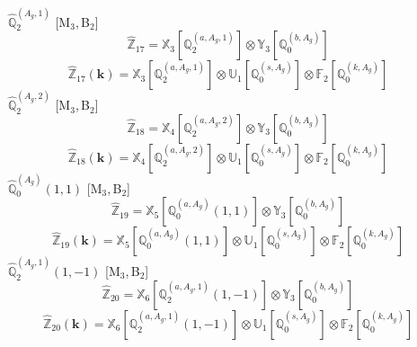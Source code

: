 \documentclass[fleqn,10pt,landscape]{article}
\begin{document}
\begin{itemize}
\noindent {} $\,\,\,\hat{\mathbb{Q}}_{2}^{(A_{g},1)}$ [M$_{3}$,\,B$_{2}$]
\begin{dmath*}
\hat{\mathbb{Z}}_{17}=\mathbb{X}_{3}[\mathbb{Q}_{2}^{(a,A_{g},1)}] \otimes\mathbb{Y}_{3}[\mathbb{Q}_{0}^{(b,A_{g})}]
\end{dmath*}
\begin{dmath*}
\hat{\mathbb{Z}}_{17}(\bm{k})=\mathbb{X}_{3}[\mathbb{Q}_{2}^{(a,A_{g},1)}] \otimes\mathbb{U}_{1}[\mathbb{Q}_{0}^{(s,A_{g})}] \otimes\mathbb{F}_{2}[\mathbb{Q}_{0}^{(k,A_{g})}]
\end{dmath*}
\vspace{4mm}
\noindent {} $\,\,\,\hat{\mathbb{Q}}_{2}^{(A_{g},2)}$ [M$_{3}$,\,B$_{2}$]
\begin{dmath*}
\hat{\mathbb{Z}}_{18}=\mathbb{X}_{4}[\mathbb{Q}_{2}^{(a,A_{g},2)}] \otimes\mathbb{Y}_{3}[\mathbb{Q}_{0}^{(b,A_{g})}]
\end{dmath*}
\begin{dmath*}
\hat{\mathbb{Z}}_{18}(\bm{k})=\mathbb{X}_{4}[\mathbb{Q}_{2}^{(a,A_{g},2)}] \otimes\mathbb{U}_{1}[\mathbb{Q}_{0}^{(s,A_{g})}] \otimes\mathbb{F}_{2}[\mathbb{Q}_{0}^{(k,A_{g})}]
\end{dmath*}
\vspace{4mm}
\noindent {} $\,\,\,\hat{\mathbb{Q}}_{0}^{(A_{g})}(1,1)$ [M$_{3}$,\,B$_{2}$]
\begin{dmath*}
\hat{\mathbb{Z}}_{19}=\mathbb{X}_{5}[\mathbb{Q}_{0}^{(a,A_{g})}(1,1)] \otimes\mathbb{Y}_{3}[\mathbb{Q}_{0}^{(b,A_{g})}]
\end{dmath*}
\begin{dmath*}
\hat{\mathbb{Z}}_{19}(\bm{k})=\mathbb{X}_{5}[\mathbb{Q}_{0}^{(a,A_{g})}(1,1)] \otimes\mathbb{U}_{1}[\mathbb{Q}_{0}^{(s,A_{g})}] \otimes\mathbb{F}_{2}[\mathbb{Q}_{0}^{(k,A_{g})}]
\end{dmath*}
\vspace{4mm}
\noindent {} $\,\,\,\hat{\mathbb{Q}}_{2}^{(A_{g},1)}(1,-1)$ [M$_{3}$,\,B$_{2}$]
\begin{dmath*}
\hat{\mathbb{Z}}_{20}=\mathbb{X}_{6}[\mathbb{Q}_{2}^{(a,A_{g},1)}(1,-1)] \otimes\mathbb{Y}_{3}[\mathbb{Q}_{0}^{(b,A_{g})}]
\end{dmath*}
\begin{dmath*}
\hat{\mathbb{Z}}_{20}(\bm{k})=\mathbb{X}_{6}[\mathbb{Q}_{2}^{(a,A_{g},1)}(1,-1)] \otimes\mathbb{U}_{1}[\mathbb{Q}_{0}^{(s,A_{g})}] \otimes\mathbb{F}_{2}[\mathbb{Q}_{0}^{(k,A_{g})}]
\end{dmath*}
\vspace{4mm}

\end{itemize}
\end{document}
